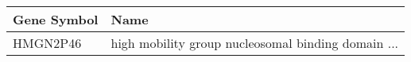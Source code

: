 \begin{tabular}{ll}
\toprule
Gene Symbol &                                               Name \\
\midrule
   HMGN2P46 & high mobility group nucleosomal binding domain ... \\
\bottomrule
\end{tabular}
